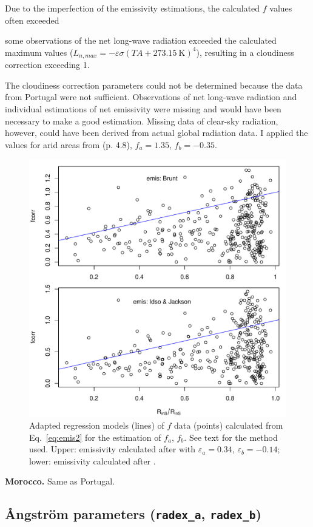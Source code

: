 \documentclass{scrreprt}
\begin{document}
Due to the imperfection of the emissivity estimations, the calculated $f$ values often exceeded

some observations of the net long-wave radiation exceeded the calculated maximum values ($L_{n,max} = -\varepsilon \sigma (TA + 273.15~\text{K})^4$), resulting in a cloudiness correction exceeding 1.

The cloudiness correction parameters could not be determined because the data from Portugal were not sufficient.
Observations of net long-wave radiation and individual estimations of net emissivity were missing and would have been necessary to make a good estimation.
Missing data of clear-sky radiation, however, could have been derived from actual global radiation data.
I applied the values for arid areas from \citet{maidment93} (p. 4.8), $f_a = 1.35$, $f_b = -0.35$.

\begin{figure}[ht]
  \centering
  \includegraphics[width=0.6\hsize]{./plot_fcorr_both.pdf}
  \caption{Adapted regression models (lines) of $f$ data (points) calculated from Eq.~\eqref{eq:emis2} for the estimation of $f_a$, $f_b$.
           See text for the method used.
           Upper: emissivity calculated after \citet{brunt32} with $\varepsilon_a = 0.34$, $\varepsilon_b = -0.14$; lower: emissivity calculated after \citet{idso69}.}
  \label{fig:portugal_fcorr}
\end{figure}

\textbf{Morocco.}
Same as Portugal.

\subsection{{\AA}ngstr\"om parameters (\texttt{radex\_a}, \texttt{radex\_b})} \label{ssec:parest_rad_radex}
\end{document}
